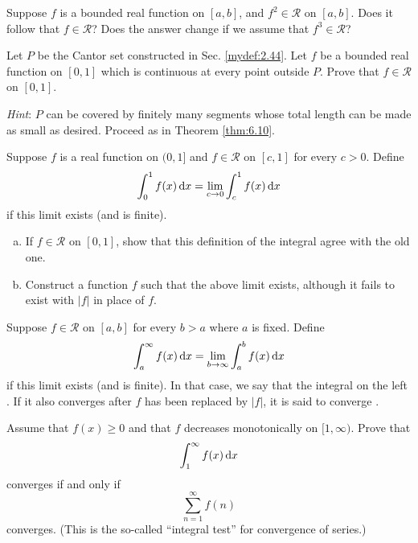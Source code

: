 \begin{myExercise}
    \label{ex:6.5}
    Suppose $f$ is a bounded real function on $[a, b]$, 
    and $f^2 \in \mathscr{R}$ on $[a, b]$. 
    Does it follow that $f \in \mathscr{R}$? 
    Does the answer change if we assume that $f^3 \in \mathscr{R}$?
\end{myExercise}


\begin{myExercise}
    \label{ex:6.6}
    Let $P$ be the Cantor set constructed in Sec. \ref{mydef:2.44}. 
    Let $f$ be a bounded real function on $[0, 1]$ which is continuous at every point outside $P$. 
    Prove that $f \in \mathscr{R}$ on $[0, 1]$.
    
    \emph{Hint}: $P$ can be covered by finitely many segments whose total length can be made as small as desired. 
    Proceed as in Theorem \ref{thm:6.10}.
\end{myExercise}


\begin{myExercise}
    \label{ex:6.7}
    Suppose $f$ is a real function on $(0, 1]$ and $f \in \mathscr{R}$ on $[c, 1]$ for every $c > 0$. 
    Define
    \begin{equation*}
        \int_{0}^{1} f(x) \d x =
        \lim_{c \to 0} \int_{c}^{1} f(x) \d x
    \end{equation*}
    if this limit exists (and is finite).
    \begin{enumerate}[(a)]
        \item If $f \in \mathscr{R}$ on $[0,1]$, show that this definition of the integral agree with the old one.
        \item Construct a function $f$ such that the above limit exists, although it fails to exist with $|f|$ in place of $f$.
    \end{enumerate}
\end{myExercise}


\begin{myExercise}
    \label{ex:6.8}
    Suppose $f \in \mathscr{R}$ on $[a, b]$ for every $b > a$ where $a$ is fixed. 
    Define
    \begin{equation*}
        \int_{a}^{\infty} f(x) \d x = 
        \lim_{b \to \infty} \int_{a}^{b} f(x) \d x
    \end{equation*}
    if this limit exists (and is finite). 
    In that case, we say that the integral on the left . 
    If it also converges after $f$ has been replaced by $|f|$, it is said to converge .

    Assume that $f(x) \geq 0$ and that $f$ decreases monotonically on $[1, \infty)$. 
    Prove that
    \begin{equation*}
        \int_{1}^{\infty} f(x) \d x
    \end{equation*}
    converges if and only if 
    \begin{equation*}
        \sum_{n=1}^{\infty} f(n)
    \end{equation*}
    converges.
    (This is the so-called ``integral test'' for convergence of series.)
\end{myExercise}



